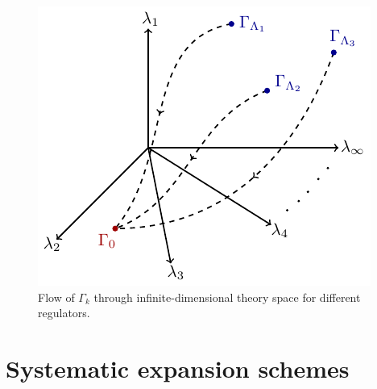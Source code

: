 
\begin{figure}[t]
\centering
\includegraphics{figs/TikZ/regulator_dependence}
\caption{Flow of $\Gamma_k$ through infinite-dimensional theory space for different regulators.}	
\end{figure}



\section{Systematic expansion schemes}
